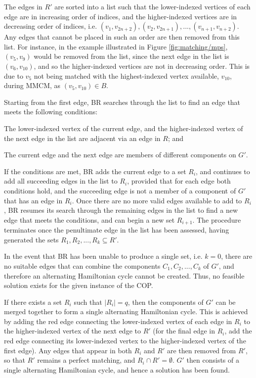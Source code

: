 \documentclass[oribibl]{llncs}
\begin{document}
The edges in $R'$ are sorted into a list such that the lower-indexed vertices of each edge are in increasing order of indices, and the higher-indexed vertices are in decreasing order of indices, i.e. $(v_1, v_{2n+2}), (v_2, v_{2n+1}), ..., (v_{n+1}, v_{n+2})$. Any edges that cannot be placed in such an order are then removed from this list. For instance, in the example illustrated in Figure \ref{fig:matching/mps}, $(v_5, v_9)$ would be removed from the list, since the next edge in the list is $(v_6, v_{10})$, and so the higher-indexed vertices are not in decreasing order. This is due to $v_5$ not being matched with the highest-indexed vertex available, $v_{10}$, during MMCM, as $(v_5, v_{10}) \in B$.

Starting from the first edge, BR searches through the list to find an edge that meets the following conditions: 
\begin{enumerate*}[label={(\alph*)}]
	\item The lower-indexed vertex of the current edge, and the higher-indexed vertex of the next edge in the list are adjacent via an edge in $R$; and
	\item The current edge and the next edge are members of different components on $G'$.
\end{enumerate*}

If the conditions are met, BR adds the current edge to a set $R_i$, and continues to add all succeeding edges in the list to $R_i$, provided that for each edge both conditions hold, and the succeeding edge is not a member of a component of $G'$ that has an edge in $R_i$. Once there are no more valid edges available to add to $R_i$, BR resumes its search through the remaining edges in the list to find a new edge that meets the conditions, and can begin a new set $R_{i+1}$. The procedure terminates once the penultimate edge in the list has been assessed, having generated the sets $R_1, R_2, ..., R_k \subseteq R'$.

In the event that BR has been unable to produce a single set, i.e. $k = 0$, there are no suitable edges that can combine the components $C_1, C_2, ..., C_k$ of $G'$, and therefore an alternating Hamiltonian cycle cannot be created. Thus, no feasible solution exists for the given instance of the COP.

If there exists a set $R_i$ such that $|R_i| = q$, then the components of $G'$ can be merged together to form a single alternating Hamiltonian cycle. This is achieved by adding the red edge connecting the lower-indexed vertex of each edge in $R_i$ to the higher-indexed vertex of the next edge to $R'$ (for the final edge in $R_i$, add the red edge connecting its lower-indexed vertex to the higher-indexed vertex of the first edge). Any edges that appear in both $R_i$ and $R'$ are then removed from $R'$, so that $R'$ remains a perfect matching, and $R_i \cap R' = \emptyset$. $G'$ then consists of a single alternating Hamiltonian cycle, and hence a solution has been found.
\end{document}
